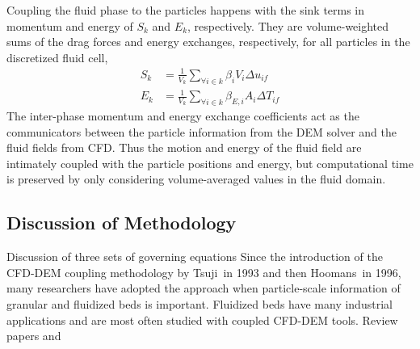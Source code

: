 Coupling the fluid phase to the particles happens with the sink terms in momentum and energy of $S_k$ and $E_k$, respectively. They are volume-weighted sums of the drag forces and energy exchanges, respectively, for all particles in the discretized fluid cell,
\begin{subequations}
\begin{align}
	S_k &= \frac{1}{V_k}\sum_{\forall i \in k} \beta_i V_i \Delta u_{if}\\
	E_k &= \frac{1}{V_k}\sum_{\forall i \in k} \beta_{E,i} A_i \Delta T_{if}
\end{align}
\end{subequations}
The inter-phase momentum and energy exchange coefficients act as the communicators between the particle information from the DEM solver and the fluid fields from CFD. Thus the motion and energy of the fluid field are intimately coupled with the particle positions and energy, but computational time is preserved by only considering volume-averaged values in the fluid domain. %


\subsection{Discussion of Methodology}
Discussion of three sets of governing equations\cite{Zhou2010}
Since the introduction of the CFD-DEM coupling methodology by Tsuji\etal~in 1993 and then Hoomans\etal~in 1996, many researchers have adopted the approach when particle-scale information of granular and fluidized beds is important.\cite{Tsuji1993,Hoomans1996} Fluidized beds have many industrial applications and are most often studied with coupled CFD-DEM tools. Review papers \cite{Zhu2007} and \cite{Deen2007}
